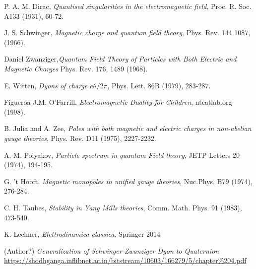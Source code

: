 \clearpage
{}
{}


\begin{thebibliography}{99}


P. A. M. Dirac,
\emph{Quantised singularities in the electromagnetic field}, Proc. R. Soc. A133 (1931), 60-72.

J. S. Schwinger, \emph{Magnetic charge and quantum field theory}, Phys. Rev. 144 1087, (1966).

Daniel Zwanziger,\emph{Quantum Field Theory of Particles with Both Electric and Magnetic Charges} Phys. Rev. 176, 1489 (1968).

E. Witten,
\emph{Dyons of charge $e\theta/2\pi$}, Phys. Lett. 86B (1979), 283-287.

Figueroa J.M. O'Farrill, \emph{Electromagnetic Duality for Children}, ntcatlab.org
(1998).

B. Julia and A. Zee, \emph{Poles with both magnetic and electric charges
in non-abelian gauge theories}, Phys. Rev. D11 (1975), 2227-2232.

A. M. Polyakov, \emph{Particle spectrum in quantum Field theory}, JETP Letters 20 (1974), 194-195.

G. 't Hooft, \emph{Magnetic monopoles in unified gauge theories}, Nuc.Phys. B79 (1974), 276-284.

C. H. Taubes, \emph{Stability in Yang Mills theories}, Comm. Math.
Phys. 91 (1983), 473-540.

K. Lechner, \emph{Elettrodinamica classica}, Springer 2014

(Author?) \emph{Generalization of Schwinger Zwanziger Dyon to Quaternion}
\url{https://shodhganga.inflibnet.ac.in/bitstream/10603/166279/5/chapter\%204.pdf}

\end{thebibliography}
